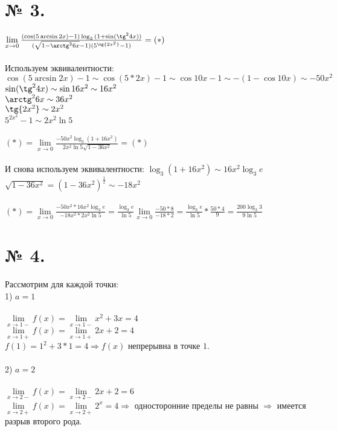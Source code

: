\documentclass[a4paper,12pt]{report}
\begin{document}
\section{№ 3.}
$\lim\limits_{x \to 0} \frac{(\cos(5\arcsin{2x}) - 1)\log_3{(1 + \sin(\tg^2{4x}))}}{(\sqrt{1 - \arctg^2{6x}} - 1)(5^{\tg{2x^2}} - 1)} = (*)$\\\\
Используем эквивалентности:\\
$\cos(5\arcsin{2x}) - 1 \sim \cos(5 * 2x) - 1 \sim \cos{10x} - 1 \sim -(1 - \cos{10x}) \sim -50x^2$\\
$\sin(\tg^2{4x}) \sim \sin{16x^2} \sim 16x^2$\\
$\arctg^2{6x} \sim 36x^2$\\
$\tg{2x^2} \sim 2x^2$\\
$5^{2x^2} - 1 \sim 2x^2\ln{5}$\\\\
$(*) = \lim\limits_{x \to 0} \frac{-50x^2\log_3{(1 + 16x^2)}}{2x^2\ln{5}\sqrt{1 - 36x^2}} = (*)$\\\\
И снова используем эквивалентности:
$\log_3{(1 + 16x^2)} \sim 16x^2\log_3{e}$\\
$\sqrt{1 - 36x^2} = (1 - 36x^2)^{\frac{1}{2}} \sim -18x^2$\\\\
$(*) = \lim\limits_{x \to 0} \frac{-50x^2 * 16x^2\log_3{e}}{-18x^2 * 2x^2\ln{5}} =  
\frac{\log_3{e}}{\ln{5}}\lim\limits_{x \to 0} \frac{-50 * 8}{-18 * 2} = \frac{\log_3{e}}{\ln{5}} * \frac{50 * 4}{9} = \frac{200\log_3{3}}{9\ln{5}}$\\
\section{№ 4.}
Рассмотрим для каждой точки:\\
1) $a = 1$\\\\
$\lim\limits_{x \to 1-} f(x) = \lim\limits_{x \to 1-} x^2 + 3x = 4$\\
$\lim\limits_{x \to 1+} f(x) = \lim\limits_{x \to 1+} 2x + 2 = 4$\\
$f(1) = 1^2 + 3 * 1 = 4 \Rightarrow f(x)$ непрерывна в точке $1$.\\\\
2) $a = 2$\\\\
$\lim\limits_{x \to 2-} f(x) = \lim\limits_{x \to 2-} 2x + 2 = 6$\\
$\lim\limits_{x \to 2+} f(x) = \lim\limits_{x \to 2+} 2^x = 4 \Rightarrow $ односторонние пределы не равны $\Rightarrow$ имеется разрыв
второго рода.\\
\end{document}
